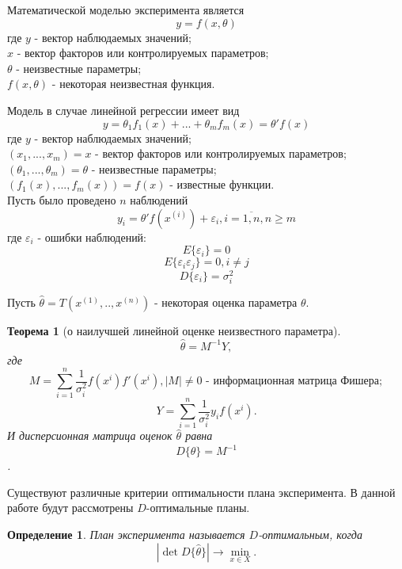 Математической моделью эксперимента является
\begin{equation}
y = f(x, \theta)  
\end{equation}
где $y$ - вектор наблюдаемых значений;\\
$x$ - вектор факторов или контролируемых параметров;\\
$\theta$ - неизвестные параметры;\\
$f(x, \theta)$ - некоторая неизвестная функция.

Модель в случае линейной регрессии имеет вид
\begin{equation}
y = \theta_1 f_1(x) +...+ \theta_m f_m(x) = \theta'f(x)
\end{equation}
где $y$ -  вектор наблюдаемых значений;\\
$(x_1,...,x_m)=x$ - вектор факторов или контролируемых параметров;\\
$(\theta_1,...,\theta_m)=\theta$ - неизвестные параметры;\\
$(f_1(x),...,f_m(x))=f(x)$ - известные функции.\\

Пусть было проведено $n$ наблюдений
\begin{equation}
y_i = \theta' f(x^{(i)}) + \varepsilon_i, i = \overline{1, n}, n \ge m
\end{equation}
где $\varepsilon_i$ - ошибки наблюдений:
$$E\{\varepsilon_i\} = 0$$
$$E\{\varepsilon_i \varepsilon_j\} = 0, i \ne j$$
$$D\{\varepsilon_i\}=\sigma_i ^2$$

Пусть $\hat{\theta} =T(x^{(1)},..,x^{(n)}) $ - некоторая оценка параметра $\theta$.\\


\newtheorem{theorem}{Теорема}

\begin{theorem}[о наилучшей линейной оценке неизвестного параметра]
	\begin{equation}
	\hat{\theta} = M^{-1} Y,
	\end{equation}
	где 
	$$M = \sum_{i=1}^{n} \frac{1}{\sigma_i^2}f(x^{i})f'(x^{i}), |M| \ne 0 \text{ - информационная матрица Фишера};$$
	$$Y = \sum_{i=1}^{n}\frac{1}{\sigma_i^2} y_i f(x^{i}).$$
	И дисперсионная матрица оценок $\hat \theta$ равна
	\begin{equation}
		D\{ \hat \theta \}  = M^{-1}
	\end{equation}.
\end{theorem}

Существуют различные критерии оптимальности плана эксперимента. В данной работе будут рассмотрены $D$-оптимальные планы.
\newtheorem{definition}{Определение}
\begin{definition}
	План эксперимента называется $D$-оптимальным, когда
	\begin{equation}\label{def:d-opt}
	|\det D\{\hat \theta\} | \rightarrow \min_{x \in X}.
	\end{equation}
\end{definition}

